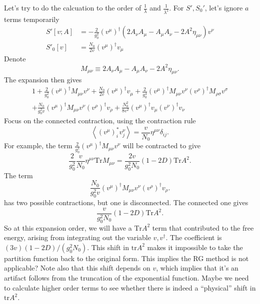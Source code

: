 Let's try to do the calcuation to the order of $\frac{1}{\lambda}$ and $\frac{1}{\lambda^2}$.
For $S',S_0'$, let's ignore $a$ terms temporarily
\begin{align*}
	S'[v;A] &= - \frac{2}{g_0^2} (v^\mu)^\dagger
	(2 A_\nu A_\mu - A_\mu A_\nu - 2 A^2 \eta_{\mu\nu}) v^\nu \\
	S'_0[v] &= \frac{N_0}{2 v} (v^\mu)^\dagger v_\mu
\end{align*}
Denote
\[
	M_{\mu\nu}\equiv 2 A_\nu A_\mu - A_\mu A_\nu - 2 A^2 \eta_{\mu\nu}
.\] 
The expansion then gives
\begin{align*}
	1 + \frac{2}{g_0^2} (v^\mu)^\dagger M_{\mu\nu} v^\nu
	+ \frac{N_0}{2v} (v^\mu)^\dagger v_\mu
	+ \frac{2}{g_0^4} (v^\mu)^\dagger M_{\mu\nu} v^\nu
	(v^\rho)^\dagger M_{\rho\sigma} v^\sigma \\
	+ \frac{N_0}{g_0^2 v} (v^\mu)^\dagger M_{\mu\nu} v^\nu (v^\rho)^\dagger v_\rho
	+ \frac{N_0^2}{8 v^2} (v^\mu)^\dagger v_\mu (v^\nu)^\dagger v_\nu
\end{align*}
Focus on the connected contraction, using the contraction rule
\[
	\left<(v^\mu)^*_i v^\nu_j \right> = \frac{v}{N_0}\eta^{\mu\nu}\delta_{ij}
.\] 
For example, the term $ \frac{2}{g_0^2} (v^\mu)^\dagger M_{\mu\nu} v^\nu$
will be contracted to give
\[
	\frac{2}{g_0^2} \frac{v}{N_0} \eta^{\mu\nu} \mathrm{Tr} M_{\mu\nu}
	= \frac{2v}{g_0^2 N_0} (1-2D) \mathrm{Tr}A^2
.\] 
The term
\[
	\frac{N_0}{g_0^2 v} (v^\mu)^\dagger M_{\mu\nu} v^\nu
	(v^\rho)^\dagger v_\rho
.\] 
has two possible contractions, but one is disconnected.
The connected one gives
\[
\frac{v}{g_0^2 N_0} (1-2D) \mathrm{Tr} A^2
.\] 
So at this expansion order,
we will have a $\mathrm{Tr}A^2$ term that contributed to the free energy,
arising from integrating out the variable $v,v^\dagger$.
The coefficient is $ (3v)(1-2D)/(g_0^2 N_0)$.
This shift in $\mathrm{tr}A^2$ makes it impossible to take the partition function back to the original form.
This implies the RG method is not applicable?
Note also that this shift depends on $v$,
which implies that it's an artifact follows from the truncation of the exponential function.
Maybe we need to calculate higher order terms to see whether there is indeed a ``physical'' shift in $\mathrm{tr} A^2$.
